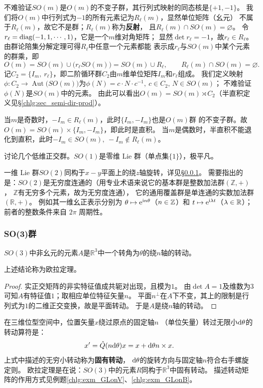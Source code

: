 不难验证$SO(m)$是$O(m)$的不变子群，其行列式映射的同态核是$\{+1,-1\}$。
我们将$O(m)$中行列式为$-1$的所有元素记为$R_{\ell}(m)$，显然单位矩阵（幺元）
不属于$R_{\ell}(m)$，故它不是群；$R_{\ell}(m)$称为\textbf{反射}，
且$R_{\ell}(m)\cap SO(m)=\varnothing$。
令$r_{\ell}=\operatorname{diag} (-1,1,\cdots,1)$，它是一个$m$维对角矩阵；
显然$\det r_{\ell} = -1$，故$r_{\ell}\in R_{\ell}$。
由群论陪集分解定理可得$R_{\ell}$中任意一个元素都能
表示成$r_{\ell}$与$SO(m)$中某个元素的群乘，即
\begin{equation*}
    O(m)= SO(m)\cup \bigl(r_{\ell}SO(m)\bigr)= SO(m) \cup R_{\ell},
    \qquad R_{\ell}(m)\cap SO(m)=\varnothing .
\end{equation*}
记$C_2=\{I_m,\ r_{\ell}\}$，即二阶循环群$C_2$由$m$维单位矩阵$I_m$和$r_{\ell}$组成。
我们定义映射$\phi:C_2 \to \operatorname{Aut}\bigl(SO(m)\bigr)$为$\phi(N)=c\cdot N \cdot c^{-1},
\  c\in C_2, \, N\in SO(m)$；
不难验证$\phi(N)$是$SO(m)$中的元素。
由此可以看出$O(m)=SO(m)\rtimes C_2$（半直积定义见\S\ref{chlg:sec_semi-dir-prod}）。

当$m$是奇数时，$-I_m \in R_{\ell}(m)$，此时$\{I_m, -I_m\}$也是$O(m)$群
的不变子群。故
$O(m)=SO(m)\times \{I_m, -I_m\}$，即此时是直积。
当$m$是偶数时，半直积不能退化到直积，此时$-I_m \in SO(m), \  -I_m \notin R_{\ell}(m)$。

讨论几个低维正交群。$SO(1)$是零维 Lie 群（单点集$\{1\}$），极平凡。

一维 Lie 群$SO(2)$同构于$x-y$平面上的绕$z$轴旋转，详见\S\ref{chlg:sec_rotation}。
需要指出的是：$SO(2)$是无穷度连通的（用专业术语来说它的基本群是整数加法群$(\mathbb{Z},+)$，
$\mathbb{Z}$有无穷多个元素，故为无穷度连通），
它的通用覆盖群是单连通的实数加法群$(\mathbb{R},+)$。
例如其一维幺正表示分别为 $\theta\mapsto\mathrm{e}^{\mathrm{i} n\theta}$（$n\in\mathbb{Z}$）和 $t\mapsto\mathrm{e}^{\mathrm{i}\lambda t}$（$\lambda\in\mathbb{R}$）；前者的整数条件来自 $2\pi$ 周期性。

\subsubsection{SO(3)群}\label{chlg:sec_rotation}

\begin{theorem}
    $SO(3)$中非幺元的元素$A$是$\mathbb{R}^3$中一个转角为$\theta$的绕$n$轴的转动。
\end{theorem}
上述结论称为欧拉定理。
\begin{proof}
实正交矩阵的非实特征值成共轭对出现，且模为$1$。
由$\det A=1$及维数为$3$可知$A$有特征值$1$；取相应单位特征矢量$n$。
平面$n^\perp$在$A$下不变，其上的限制是行列式为$1$的二维正交变换，故是平面转动。
于是$A$是绕$n$轴的转动。
\end{proof}
在三维位型空间中，位置矢量$x$绕过原点的固定轴$n$
（单位矢量）转过无限小$\dd \theta$的转动算符是：
\begin{equation}
    x' = \hat{Q}(n\dd \theta) x
    = x +  \dd \theta n\times x .
\end{equation}
上式中描述的无穷小转动称为\textbf{固有转动}，
$\dd \theta$的旋转方向与固定轴$n$符合右手螺旋定则。
欧拉定理是在说：$SO(3)$中的元素$R$同构于$\mathbb{R}^3$中固有转动。
描述转动矩阵的作用方式见例题\ref{chlg:exm_GLonV}、\ref{chlg:exm_GLonB}。

